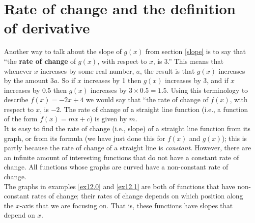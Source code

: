 \section{Rate of change and the definition of derivative} \label{rate of change}
\noindent Another way to talk about the slope of $g(x)$ from section \ref{slope} is to say that ``the \textbf{rate of change} of $g(x)$, with respect to $x$, is $3$.'' This means that whenever $x$ increases by some real number, $a$, the result is that $g(x)$ increases by the amount $3a$. So if $x$ increases by 1 then $g(x)$ increases by $3$, and if $x$ increases by $0.5$ then $g(x)$ increases by $3\times0.5 = 1.5$. Using this terminology to describe $f(x) = -2x + 4$ we would say that ``the rate of change of $f(x)$, with respect to $x$, is $-2$. The rate of change of a straight line function (i.e., a function of the form $f(x) = mx + c$) is given by $m$.\\

\noindent It is easy to find the rate of change (i.e., slope) of a straight line function from its graph, or from its formula (we have just done this for $f(x)$ and $g(x)$); this is partly because the rate of change of a straight line is \textit{constant}. However, there are an infinite amount of interesting functions that do not have a constant rate of change. All functions whose graphs are curved have a non-constant rate of change. \\

\noindent The graphs in examples \ref{ex12.0} and \ref{ex12.1} are both of functions that have non-constant rates of change; their rates of change depends on which position along the $x$-axis that we are focusing on. That is, these functions have slopes that depend on $x$. \\

